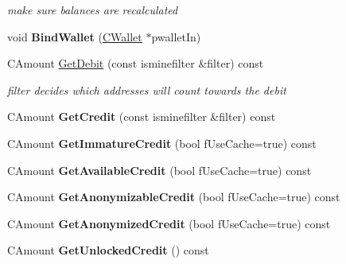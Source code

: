 \begin{DoxyCompactItemize}
\begin{DoxyCompactList}\small\item\em make sure balances are recalculated \end{DoxyCompactList}\item 
\mbox{\label{class_c_wallet_tx_ab0ee7347584bff886dc24b9f63ff023c}} 
void {\bfseries Bind\+Wallet} (\mbox{\hyperlink{class_c_wallet}{C\+Wallet}} $\ast$pwallet\+In)
\item 
\mbox{\label{class_c_wallet_tx_a7757c17a323e5f6f75c92acb398d3568}} 
C\+Amount \mbox{\hyperlink{class_c_wallet_tx_a7757c17a323e5f6f75c92acb398d3568}{Get\+Debit}} (const isminefilter \&filter) const
\begin{DoxyCompactList}\small\item\em filter decides which addresses will count towards the debit \end{DoxyCompactList}\item 
\mbox{\label{class_c_wallet_tx_a176e9ecbafbee27d604acbab9804885d}} 
C\+Amount {\bfseries Get\+Credit} (const isminefilter \&filter) const
\item 
\mbox{\label{class_c_wallet_tx_a19bb617269ab1ce42f5d18e1f1f8db09}} 
C\+Amount {\bfseries Get\+Immature\+Credit} (bool f\+Use\+Cache=true) const
\item 
\mbox{\label{class_c_wallet_tx_af3c82ba365c720dd3d929b86bf432ef6}} 
C\+Amount {\bfseries Get\+Available\+Credit} (bool f\+Use\+Cache=true) const
\item 
\mbox{\label{class_c_wallet_tx_a36141f888e497336898f48274b92cf37}} 
C\+Amount {\bfseries Get\+Anonymizable\+Credit} (bool f\+Use\+Cache=true) const
\item 
\mbox{\label{class_c_wallet_tx_a49cae757845e1bf0cb3c8e17bd96d4a1}} 
C\+Amount {\bfseries Get\+Anonymized\+Credit} (bool f\+Use\+Cache=true) const
\item 
\mbox{\label{class_c_wallet_tx_aaf06deb84a9ed045f0ac40e13685f4f0}} 
C\+Amount {\bfseries Get\+Unlocked\+Credit} () const
\item 
\mbox{\label{class_c_wallet_tx_a910d8a59331797413b3ae71e879249c2}} 

\end{DoxyCompactItemize}
